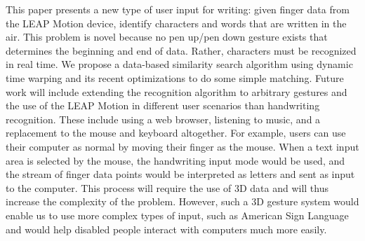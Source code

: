 This paper presents a new type of user input for writing: given finger data from the LEAP Motion device, identify characters and words that are written in the air. This problem is novel because no pen up/pen down gesture exists that determines the beginning and end of data. Rather, characters must be recognized in real time. We propose a data-based similarity search algorithm using dynamic time warping and its recent optimizations to do some simple matching. Future work will include extending the recognition algorithm to arbitrary gestures and the use of the LEAP Motion in different user scenarios than handwriting recognition. These include using a web browser, listening to music, and a replacement to the mouse and keyboard altogether. For example, users can use their computer as normal by moving their finger as the mouse. When a text input area is selected by the mouse, the handwriting input mode would be used, and the stream of finger data points would be interpreted as letters and sent as input to the computer. This process will require the use of 3D data and will thus increase the complexity of the problem. However, such a 3D gesture system would enable us to use more complex types of input, such as American Sign Language and would help disabled people interact with computers much more easily.\\
